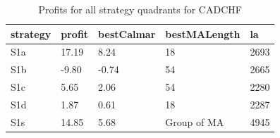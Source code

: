 \documentclass{tewiart}
\begin{document}
\newpage
\begin{table}[!t]
\caption{Profits for all strategy quadrants for CADCHF}
 \begin{center}
 \begin{tabular}{|l|l|l|l|l|}
 \hline \textbf{strategy} & \textbf{profit} & \textbf{bestCalmar} & \textbf{bestMALength} & \textbf{la} \\ \hline
S1a & 17.19 & 8.24 & 18 & 2693\\ \hline
S1b & -9.80 & -0.74 & 54 & 2665\\ \hline
S1c & 5.65 & 2.06 & 54 & 2280\\ \hline
S1d & 1.87 & 0.61 & 18 & 2287\\ \hline
S1s & 14.85 & 5.68 & Group of MA & 4945\\
\hline \end{tabular}
 \end{center}
 \end{table}
\FloatBarrier
\end{document}
